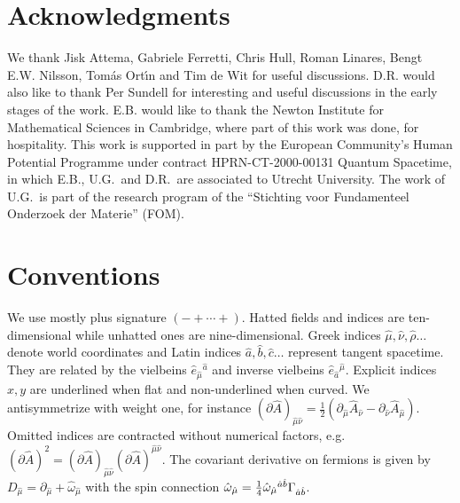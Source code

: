 \documentclass[12pt,a4paper]{article}
\begin{document}
\section*{Acknowledgments}

We thank Jisk Attema, Gabriele Ferretti, Chris Hull, Roman Linares, Bengt E.W. Nilsson, 
Tom\'as Ort\'\i n
and Tim de Wit for useful discussions. D.R. would also like to
thank Per Sundell for interesting and useful discussions in the
early stages of the work. E.B. would like to thank the Newton Institute
for Mathematical Sciences in Cambridge, where part of this
work was done, for hospitality. This work is supported in part by the
European Community's Human Potential Programme under contract
HPRN-CT-2000-00131 Quantum Spacetime, in which E.B., U.G.~and
D.R.~are associated to Utrecht University. The work of U.G.~is
part of the research program of the ``Stichting voor Fundamenteel
Onderzoek der Materie'' (FOM).


\appendix
\section{Conventions}
We use mostly plus signature $(-+\cdots +)$. Hatted fields
and indices are ten-dimensional while unhatted ones
are nine-dimensional. Greek indices
$\hat \mu,\hat \nu,\hat \rho\ldots$ denote world coordinates and Latin indices
$\hat a,\hat b,\hat c\ldots$ represent tangent spacetime. They are related by the
vielbeins $\hat e_{\hat \mu}{}^{\hat a}$ and inverse vielbeins $\hat e_{\hat a}{}^{\hat \mu}$.
Explicit indices $x,y$ are underlined when flat and non-underlined when curved.
We antisymmetrize with weight one, for instance
$(\partial \hat A)_{\hat \mu \hat \nu} =
 \tfrac{1}{2} (\partial_{\hat \mu} \hat A_{\hat \nu} - \partial_{\hat \nu} \hat A_{\hat \mu})$.
Omitted indices are contracted without numerical factors,
e.g.~$(\partial \hat A)^2 = (\partial \hat A)_{\hat \mu \hat \nu}
(\partial \hat A)^{\hat \mu \hat \nu}$. The covariant derivative
on fermions is given by $D_{\hat{\mu}}=\partial_{\hat{\mu}}+
\hat{\omega}_{\hat \mu}$ with the spin connection
$\hat{\omega}_{\hat \mu} = {\textstyle{1\over 4}}
\hat{\omega}_{\hat{\mu}}{}^{{\hat{a}} {\hat{b}}}
{\Gamma}_{{\hat{a}}{\hat{b}}}$.
\end{document}

